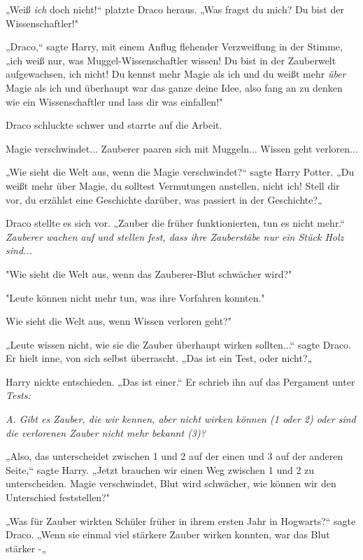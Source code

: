 {„Weiß \emph{ich} doch nicht!“ platzte Draco heraus. „Was fragst du mich? Du bist der Wissenschaftler!"

„Draco,“ sagte Harry, mit einem Anflug flehender Verzweiflung in der Stimme, „ich weiß nur, was Muggel-Wissenschaftler wissen! Du bist in der Zauberwelt aufgewachsen, ich nicht! Du kennst mehr Magie als ich und du weißt mehr \emph{über} Magie als ich und überhaupt war das ganze deine Idee, also fang an zu denken wie ein Wissenschaftler und lass dir was einfallen!"

Draco schluckte schwer und starrte auf die Arbeit.

Magie verschwindet... Zauberer paaren sich mit Muggeln... Wissen geht verloren...

„Wie sieht die Welt aus, wenn die Magie verschwindet?“ sagte Harry Potter. „Du weißt mehr über Magie, du solltest Vermutungen anstellen, nicht ich! Stell dir vor, du erzählst eine Geschichte darüber, was passiert in der Geschichte?„

Draco stellte es sich vor. „Zauber die früher funktionierten, tun es nicht mehr.“ \emph{Zauberer wachen auf und stellen fest, dass ihre Zauberstäbe nur ein Stück Holz sind...}

"Wie sieht die Welt aus, wenn das Zauberer-Blut schwächer wird?"

"Leute können nicht mehr tun, was ihre Vorfahren konnten."

Wie sieht die Welt aus, wenn Wissen verloren geht?"

„Leute wissen nicht, wie sie die Zauber überhaupt wirken sollten...“ sagte Draco. Er hielt inne, von sich selbst überrascht. „Das ist ein Test, oder nicht?„

Harry nickte entschieden. „Das ist einer.“ Er schrieb ihn auf das Pergament unter \emph{Tests:}

\emph{A. Gibt es Zauber, die wir kennen, aber nicht wirken können (1 oder 2) oder sind die verlorenen Zauber nicht mehr bekannt (3)?}

„Also, das unterscheidet zwischen 1 und 2 auf der einen und 3 auf der anderen Seite,“ sagte Harry. „Jetzt brauchen wir einen Weg zwischen 1 und 2 zu unterscheiden. Magie verschwindet, Blut wird schwächer, wie können wir den Unterschied feststellen?"

„Was für Zauber wirkten Schüler früher in ihrem ersten Jahr in Hogwarts?“ sagte Draco. „Wenn sie einmal viel stärkere Zauber wirken konnten, war das Blut stärker -„

}
